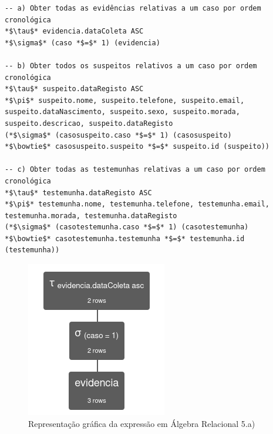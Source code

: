 \documentclass[a4paper,12pt]{scrreprt}
\begin{document}
\begin{lstlisting}[escapechar=*]
-- a) Obter todas as evidências relativas a um caso por ordem cronológica
*$\tau$* evidencia.dataColeta ASC
*$\sigma$* (caso *$=$* 1) (evidencia)

-- b) Obter todos os suspeitos relativos a um caso por ordem cronológica
*$\tau$* suspeito.dataRegisto ASC
*$\pi$* suspeito.nome, suspeito.telefone, suspeito.email, suspeito.dataNascimento, suspeito.sexo, suspeito.morada, suspeito.descricao, suspeito.dataRegisto
(*$\sigma$* (casosuspeito.caso *$=$* 1) (casosuspeito)
*$\bowtie$* casosuspeito.suspeito *$=$* suspeito.id (suspeito))

-- c) Obter todas as testemunhas relativas a um caso por ordem cronológica
*$\tau$* testemunha.dataRegisto ASC
*$\pi$* testemunha.nome, testemunha.telefone, testemunha.email, testemunha.morada, testemunha.dataRegisto
(*$\sigma$* (casotestemunha.caso *$=$* 1) (casotestemunha)
*$\bowtie$* casotestemunha.testemunha *$=$* testemunha.id (testemunha))
\end{lstlisting}

\begin{figure}[!ht]
    \centering
    \includegraphics[scale=0.9]{images/relax/5-a.png}
    \caption{Representação gráfica da expressão em Álgebra Relacional 5.a)}
    \label{fig:4.5}
\end{figure}

\clearpage
\end{document}
